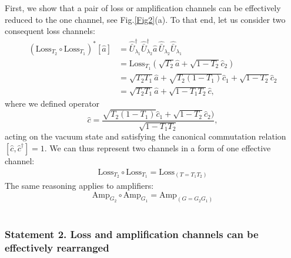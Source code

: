 \documentclass[a4paper]{article}
\renewcommand{\t}[1]{\mathrm{#1}}
\newcommand{\be}{\begin{equation}}
\newcommand{\ee}{\end{equation}}
\begin{document}
First, we show that a pair of loss or amplification channels can be effectively reduced to the one channel, see Fig.\ref{Fig2}(a).
To that end, let us consider two consequent loss channels:
\be\begin{split}
    (\t{Loss}_{T_2}\circ \t{Loss}_{T_1})^* [\hat{a}] &= \hat{\bar U}_{\lambda_1}^\dag \hat{\bar U}_{\lambda_2}^\dag \hat{a} \, \hat{\bar U}_{\lambda_2} \hat{\bar U}_{\lambda_1}\\
    &=\t{Loss}_{T_1}(\sqrt{T_2}\hat{a} + \sqrt{1- T_2} \hat{c}_2)\\
    & = \sqrt{T_2 T_1} \hat{a} + \sqrt{T_2(1-T_1)}\hat{c}_1 + \sqrt{1- T_2} \hat{c}_2\\
    & = \sqrt{T_2 T_1} \hat{a} + \sqrt{1-T_1T_2} \hat{c},
\end{split}
\ee
where we defined operator 
\be
\hat{c} =\frac{\sqrt{T_2(1-T_1)}\hat{c}_1 + \sqrt{1- T_2} \hat{c}_2)}{\sqrt{1-T_1T_2}},
\ee
acting on the vacuum state and satisfying the canonical commutation relation $[\hat{c},\hat{c}^\dag]=1$. 
We can thus represent two channels in a form of one effective channel:
\be\begin{split}
    \t{Loss}_{T_2}\circ \t{Loss}_{T_1} = \t{Loss}_{(T=T_1T_2)}
\end{split}
\ee
The same reasoning applies to amplifiers:
\be
    \t{Amp}_{G_2}\circ \t{Amp}_{G_1} = \t{Amp}_{(G=G_2G_1)}
\ee\\

\subsubsection*{Statement 2. Loss and amplification channels can be effectively rearranged}
\end{document}
